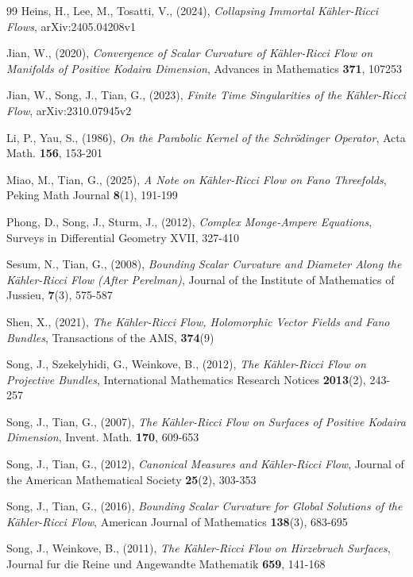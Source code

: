 \documentclass[12pt]{article}
\numberwithin{equation}{section}
\begin{document}
\begin{thebibliography}{99}
 Heins, H., Lee, M., Tosatti, V., (2024), 
\textit{Collapsing Immortal K\"ahler-Ricci Flows}, 
arXiv:2405.04208v1

 Jian, W., (2020), 
\textit{Convergence of Scalar Curvature of K\"ahler-Ricci Flow on Manifolds of Positive Kodaira Dimension}, Advances in Mathematics \textbf{371}, 107253

 Jian, W., Song, J., Tian, G., (2023), 
\textit{Finite Time Singularities of the K\"ahler-Ricci Flow}, arXiv:2310.07945v2

 Li, P., Yau, S., (1986), 
\textit{On the Parabolic Kernel of the Schr\"odinger Operator}, 
Acta Math. \textbf{156}, 153-201

 Miao, M., Tian, G., (2025), 
\textit{A Note on K\"ahler-Ricci Flow on Fano Threefolds}, 
Peking Math Journal \textbf{8}(1), 191-199

 Phong, D., Song, J., Sturm, J., (2012), 
\textit{Complex Monge-Ampere Equations}, 
Surveys in Differential Geometry XVII, 327-410

 Sesum, N., Tian, G., (2008), 
\textit{Bounding Scalar Curvature and Diameter Along the K\"ahler-Ricci Flow (After Perelman)}, 
Journal of the Institute of Mathematics of Jussieu, \textbf{7}(3), 575-587

 Shen, X., (2021), 
\textit{The K\"ahler-Ricci Flow, Holomorphic Vector Fields and Fano Bundles}, Transactions of the AMS, \textbf{374}(9)

 Song, J., Szekelyhidi, G., Weinkove, B., (2012), 
\textit{The K\"ahler-Ricci Flow on Projective Bundles},
International Mathematics Research Notices \textbf{2013}(2), 243-257

 Song, J., Tian, G., (2007), 
\textit{The K\"ahler-Ricci Flow on Surfaces of Positive Kodaira Dimension}, 
Invent. Math. \textbf{170}, 609-653

 Song, J., Tian, G., (2012), 
\textit{Canonical Measures and K\"ahler-Ricci Flow}, 
Journal of the American Mathematical Society \textbf{25}(2), 303-353

 Song, J., Tian, G., (2016),
\textit{Bounding Scalar Curvature for Global Solutions of the K\"ahler-Ricci Flow}, American Journal of Mathematics \textbf{138}(3), 683-695

 Song, J., Weinkove, B., (2011), 
\textit{The K\"ahler-Ricci Flow on Hirzebruch Surfaces}, 
Journal fur die Reine und Angewandte Mathematik \textbf{659}, 141-168


\end{thebibliography}
\end{document}
